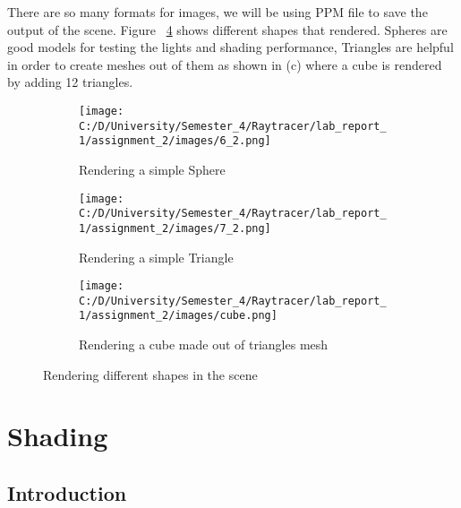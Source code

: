\documentclass{article}
\begin{document}
	There are so many formats for images, we will be using PPM file to save the output of the scene. Figure ~\ref{fig:5} shows different shapes that rendered. Spheres are good models for testing the lights and shading performance, Triangles are helpful in order to create meshes out of them as shown in (c) where a cube is rendered by adding 12 triangles. 
	\begin{figure}[ht]
		\begin{center}
			\begin{subfigure}{.3\textwidth}
				\centering
				\texttt{[image: C:/D/University/Semester\_4/Raytracer/lab\_report\_1/assignment\_2/images/6\_2.png]}  
				\caption{Rendering a simple Sphere}
				\label{fig:sub-first}
			\end{subfigure}
			\begin{subfigure}{.3\textwidth}
				\centering
				\texttt{[image: C:/D/University/Semester\_4/Raytracer/lab\_report\_1/assignment\_2/images/7\_2.png]}  
				\caption{Rendering a simple Triangle}
				\label{fig:sub-second}
			\end{subfigure}
			\begin{subfigure}{.3\textwidth}
				\centering
				\texttt{[image: C:/D/University/Semester\_4/Raytracer/lab\_report\_1/assignment\_2/images/cube.png]}  
				\caption{Rendering a cube made out of triangles mesh}
				\label{fig:sub-third}
			\end{subfigure}
			
			\caption{Rendering different shapes in the scene}
			\label{fig:5}
			
		\end{center}
	\end{figure}
	
	\clearpage
	
	
	
	
	\section{Shading}
	\subsection{Introduction}
	
\end{document}
